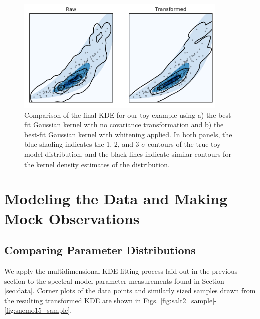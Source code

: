 \begin{figure}
    \centering
    \includegraphics[width=0.9\textwidth]{figures/snemo_kde/2d_scatter.pdf}
    \caption{Comparison of the final KDE for our toy example using a) the best-fit Gaussian kernel with no covariance transformation and b) the best-fit Gaussian kernel with whitening applied. In both panels, the blue shading indicates the 1, 2, and 3 $\sigma$ contours of the true toy model distribution, and the black lines indicate similar contours for the kernel density estimates of the distribution.}
    \label{fig:2d_scatter_scaled}
\end{figure}

\section{Modeling the Data and Making Mock Observations}
\label{sec:making_mocks}
\subsection{Comparing Parameter Distributions}
We apply the multidimensional KDE fitting process laid out in the previous section to the spectral model parameter measurements found in Section \ref{sec:data}. Corner plots of the data points and similarly sized samples drawn from the resulting transformed KDE are shown in Figs. \ref{fig:salt2_sample}-\ref{fig:snemo15_sample}.

